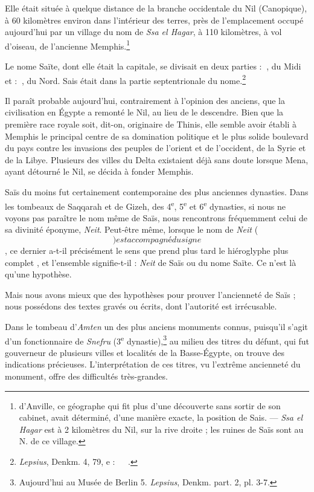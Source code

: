 \documentclass[a4paper, 11pt, oneside]{article}
\newcommand*\hieroAAAA{}
\newcommand*\hieroAAAB{}
\newcommand*\hieroAAAQ{}
\newcommand*\hieroAAAX{}
\newcommand*\hieroAAAY{}
\newcommand*\hieroAAAZ{}
\newcommand*\hieroAABA{}
\newcommand*\hieroAABB{}
\newcommand*\hieroAABC{\raisebox{0.5ex}{}}
\newcommand*\hieroAABD{}
\newcommand*\hieroAABE{}
\newcommand*\hieroAABF{}
\begin{document}
Elle était située à quelque distance de la branche occidentale du Nil (Canopique), à 60 kilomètres environ dans l'intérieur des terres, près de l'emplacement occupé aujourd’hui par un village du nom de \emph{Ssa el Hagar}, à 110 kilomètres, à vol d'oiseau, de l'ancienne Memphis.\footnote{d'Anville, ce géographe qui fit plus d'une découverte sans sortir de son cabinet, avait déterminé, d'une manière exacte, la position de Sais. --- \emph{Ssa el Hagar} est à 2 kilomètres du Nil, sur la rive droite ; les ruines de Saïs sont au N. de ce village.}

Le nome Saïte, dont elle était la capitale, se divisait en deux parties : $\hieroAAAB\:\hieroAAAX$, du Midi et : $\hieroAAAB\:\hieroAAAY$, du Nord. Sais était dans la partie septentrionale du nome.\footnote{\emph{Lepsius}, Denkm. 4, 79, e : $\hieroAAAZ\:\hieroAABA\:\hieroAABB\:\hieroAABC\:\hieroAABD\:\hieroAABE$.}

Il paraît probable aujourd'hui, contrairement à l'opinion des anciens, que la civilisation en Égypte a remonté le Nil, au lieu de le descendre. Bien que la première race royale soit, dit-on, originaire de Thinis, elle semble avoir établi à Memphis le principal centre de sa domination politique et le plus solide boulevard du pays contre les invasions des peuples de l'orient et de l'occident, de la Syrie et de la Libye. Plusieurs des villes du Delta existaient déjà sans doute lorsque Mena, ayant détourné le Nil, se décida à fonder Memphis.

Saïs du moins fut certainement contemporaine des plus anciennes dynasties. Dans les tombeaux de Saqqarah et de Gizeh, des 4\textsuperscript{e}, 5\textsuperscript{e} et 6\textsuperscript{e} dynasties, si nous ne voyons pas paraître le nom même de Saïs, nous rencontrons fréquemment celui de sa divinité éponyme, \emph{Neit}. Peut-être même, lorsque le nom de \emph{Neit} ($\hieroAAAQ$) est accompagné du signe $\hieroAABF$, ce dernier a-t-il précisément le sens que prend plus tard le hiéroglyphe plus complet $\hieroAAAA$, et l'ensemble signifie-t-il : \emph{Neit} de Saïs ou du nome Saïte. Ce n'est là qu'une hypothèse.

Mais nous avons mieux que des hypothèses pour prouver l'ancienneté de Saïs ; nous possédons des textes gravés ou écrits, dont l'autorité est irrécusable.

Dans le tombeau d'\emph{Amten} un des plus anciens monuments connus, puisqu'il s'agit d'un fonctionnaire de \emph{Snefru} (3\textsuperscript{e} dynastie),\footnote{Aujourd'hui au Musée de Berlin 5. \emph{Lepsius}, Denkm. part. 2, pl. 3-7.} au milieu des titres du défunt, qui fut gouverneur de plusieurs villes et localités de la Basse-Égypte, on trouve des indications précieuses. L'interprétation de ces titres, vu l'extrême ancienneté du monument, offre des difficultés très-grandes.
\end{document}
